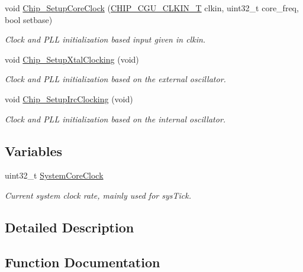 \begin{DoxyCompactItemize}
void \hyperlink{group___s_u_p_p_o_r_t__18_x_x__43_x_x___f_u_n_c_ga54251628aeac543524d98d4db12c39f9}{Chip\+\_\+\+Setup\+Core\+Clock} (\hyperlink{group___c_l_o_c_k__18_x_x__43_x_x_ga0975326707efebf2b074283e6c602f18}{C\+H\+I\+P\+\_\+\+C\+G\+U\+\_\+\+C\+L\+K\+I\+N\+\_\+T} clkin, uint32\+\_\+t core\+\_\+freq, bool setbase)
\begin{DoxyCompactList}\small\item\em Clock and P\+LL initialization based input given in {\itshape clkin}. \end{DoxyCompactList}\item 
void \hyperlink{group___s_u_p_p_o_r_t__18_x_x__43_x_x___f_u_n_c_ga18737e4a022570724c77c5cdea9c0258}{Chip\+\_\+\+Setup\+Xtal\+Clocking} (void)
\begin{DoxyCompactList}\small\item\em Clock and P\+LL initialization based on the external oscillator. \end{DoxyCompactList}\item 
void \hyperlink{group___s_u_p_p_o_r_t__18_x_x__43_x_x___f_u_n_c_ga6eff97a8da15798119eada6c5f000404}{Chip\+\_\+\+Setup\+Irc\+Clocking} (void)
\begin{DoxyCompactList}\small\item\em Clock and P\+LL initialization based on the internal oscillator. \end{DoxyCompactList}\end{DoxyCompactItemize}
\subsection*{Variables}
\begin{DoxyCompactItemize}
\item 
uint32\+\_\+t \hyperlink{group___s_u_p_p_o_r_t__18_x_x__43_x_x___f_u_n_c_gaa3cd3e43291e81e795d642b79b6088e6}{System\+Core\+Clock}
\begin{DoxyCompactList}\small\item\em Current system clock rate, mainly used for sys\+Tick. \end{DoxyCompactList}\end{DoxyCompactItemize}


\subsection{Detailed Description}


\subsection{Function Documentation}
\mbox{\label{group___s_u_p_p_o_r_t__18_x_x__43_x_x___f_u_n_c_ga54251628aeac543524d98d4db12c39f9}} 
